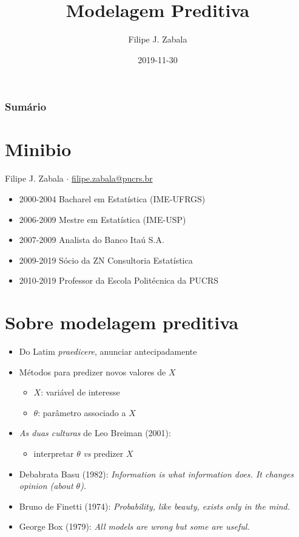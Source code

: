 \documentclass{beamer}
\title{Modelagem Preditiva}
\author{Filipe J. Zabala}
\institute{\href{http://www.pucrs.br/politecnica/}{Escola Politécnica} \\ \href{http://www.pucrs.br/}{PUCRS}}
\date{2019-11-30}
\begin{document}
\frame{\titlepage}

\begin{frame}
    \frametitle{Sumário}
    \tableofcontents
\end{frame}

\section{Minibio}
\begin{frame}{\secname}
Filipe J. Zabala $\cdot$ \url{filipe.zabala@pucrs.br}
\vspace{1cm}
  \begin{itemize}
    \item 2000-2004 Bacharel em Estatística (IME-UFRGS)
    \item 2006-2009 Mestre em Estatística (IME-USP)
    \item 2007-2009 Analista do Banco Itaú S.A.
    \item 2009-2019 Sócio da ZN Consultoria Estatística
    \item 2010-2019 Professor da Escola Politécnica da PUCRS
  \end{itemize}
\end{frame}

\section{Sobre modelagem preditiva}
\begin{frame}{\secname}
    \begin{itemize}
    \item Do Latim \textit{praedicere}, anunciar antecipadamente
    \pause
    \item Métodos para predizer novos valores de $X$
      \begin{itemize}
      \item $X$: variável de interesse
      \item $\theta$: parâmetro associado a $X$
      \end{itemize}
    \pause
    \item \textit{As duas culturas} de Leo Breiman (2001):
      \begin{itemize}
      \item interpretar $\theta$ \textit{vs} predizer $X$
      \end{itemize}
    \pause
    \item Debabrata Basu (1982): \textit{Information is what information does. It changes opinion (about $\theta$).}
    \pause
    \item Bruno de Finetti (1974): \textit{Probability, like beauty, exists only in the mind.}
    \pause
    \item George Box (1979): \textit{All models are wrong but some are useful.}
    \end{itemize}
\end{frame}
\end{document}
